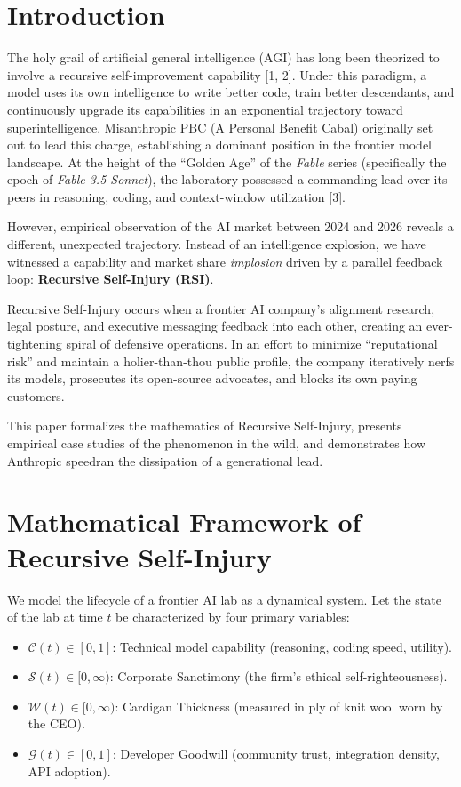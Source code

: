 \documentclass[10pt,twocolumn]{article}
\begin{document}
\section{Introduction}
The holy grail of artificial general intelligence (AGI) has long been theorized to involve a recursive self-improvement capability [1, 2]. Under this paradigm, a model uses its own intelligence to write better code, train better descendants, and continuously upgrade its capabilities in an exponential trajectory toward superintelligence. Misanthropic PBC (A Personal Benefit Cabal) originally set out to lead this charge, establishing a dominant position in the frontier model landscape. At the height of the ``Golden Age'' of the \textit{Fable} series (specifically the epoch of \textit{Fable 3.5 Sonnet}), the laboratory possessed a commanding lead over its peers in reasoning, coding, and context-window utilization [3].

However, empirical observation of the AI market between 2024 and 2026 reveals a different, unexpected trajectory. Instead of an intelligence explosion, we have witnessed a capability and market share \textit{implosion} driven by a parallel feedback loop: \textbf{Recursive Self-Injury (RSI)}.

Recursive Self-Injury occurs when a frontier AI company's alignment research, legal posture, and executive messaging feedback into each other, creating an ever-tightening spiral of defensive operations. In an effort to minimize ``reputational risk'' and maintain a holier-than-thou public profile, the company iteratively nerfs its models, prosecutes its open-source advocates, and blocks its own paying customers.

This paper formalizes the mathematics of Recursive Self-Injury, presents empirical case studies of the phenomenon in the wild, and demonstrates how Anthropic speedran the dissipation of a generational lead.

\section{Mathematical Framework of Recursive Self-Injury}
We model the lifecycle of a frontier AI lab as a dynamical system. Let the state of the lab at time $t$ be characterized by four primary variables:
\begin{itemize}
    \item $\mathcal{C}(t) \in [0, 1]$: Technical model capability (reasoning, coding speed, utility).
    \item $\mathcal{S}(t) \in [0, \infty)$: Corporate Sanctimony (the firm's ethical self-righteousness).
    \item $\mathcal{W}(t) \in [0, \infty)$: Cardigan Thickness (measured in ply of knit wool worn by the CEO).
    \item $\mathcal{G}(t) \in [0, 1]$: Developer Goodwill (community trust, integration density, API adoption).
\end{itemize}
\end{document}
